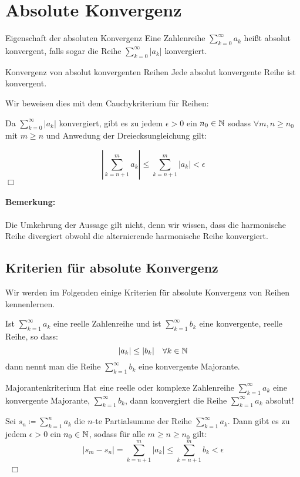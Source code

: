 \section{Absolute Konvergenz}
\begin{definition}{Eigenschaft der absoluten Konvergenz}
	Eine Zahlenreihe $\sum_{k=0}^\infty a_k$ heißt absolut konvergent, falls sogar die Reihe $\sum_{k=0}^\infty |a_k|$ konvergiert.
\end{definition}
\begin{satz}{Konvergenz von absolut konvergenten Reihen}
	Jede absolut konvergente Reihe ist konvergent.
\end{satz}
\beweis
Wir beweisen dies mit dem Cauchykriterium für Reihen:

Da $\sum_{k=0}^\infty |a_k|$ konvergiert, gibt es zu jedem $\epsilon > 0$ ein $n_0\in\mathbb{N}$ sodass $\forall m,n\geq n_0$ mit $m\geq n$ und Anwedung der Dreiecksungleichung gilt:

\begin{equation*}
	\left|\sum\limits_{k=n+1}^m a_k\right|\leq\sum\limits_{k=n+1}^m |a_k|<\epsilon
\end{equation*}
\hfill$\Box$

\paragraph{Bemerkung:}
Die Umkehrung der Aussage gilt nicht, denn wir wissen, dass die harmonische Reihe divergiert obwohl die alternierende harmonische Reihe konvergiert.




\subsection{Kriterien für absolute Konvergenz}
Wir werden im Folgenden einige Kriterien für absolute Konvergenz von Reihen kennenlernen.
\begin{definition}{}
	Ist $\sum_{k=1}^\infty a_k$ eine reelle Zahlenreihe und ist $\sum_{k=1}^\infty b_k$ eine konvergente, reelle Reihe, so dass:
	\begin{equation*}
		|a_k|\leq|b_k| \quad \forall k\in\mathbb{N}
	\end{equation*}
	dann nennt man die Reihe $\sum_{k=1}^\infty b_k$ eine konvergente Majorante.
\end{definition}

\begin{satz}{Majorantenkriterium}
	Hat eine reelle oder komplexe Zahlenreihe $\sum_{k=1}^\infty a_k$ eine konvergente Majorante, $\sum_{k=1}^\infty b_k$, dann konvergiert die Reihe $\sum_{k=1}^\infty a_k$ absolut!
\end{satz}
\begin{beweis}
	Sei $s_n\coloneqq \sum_{k=1}^n a_k$ die $n$-te Partialsumme der Reihe $\sum_{k=1}^\infty a_k$. Dann gibt es zu jedem $\epsilon>0$ ein $n_0\in\mathbb{N}$, sodass für alle $m\geq n\geq n_0$ gilt:
	\begin{equation*}
		|s_m-s_n|=\sum_{k=n+1}^m |a_k|\leq \sum_{k=n+1}^m b_k <\epsilon
	\end{equation*}
	\ \hfill$\Box$
\end{beweis}

